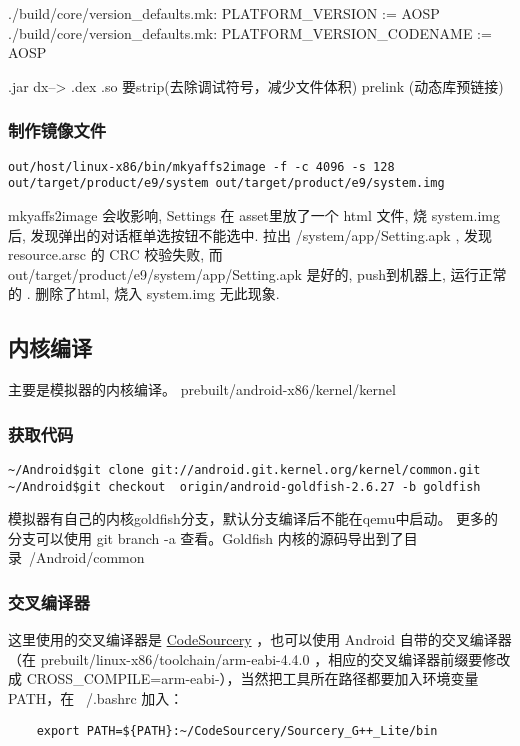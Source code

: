 \documentclass[a4paper,titlepage]{article}
\begin{document}
./build/core/version_defaults.mk:  PLATFORM_VERSION := AOSP 
./build/core/version_defaults.mk:  PLATFORM_VERSION_CODENAME := AOSP 



.jar   dx-->  .dex   
.so    要strip(去除调试符号，减少文件体积)  prelink (动态库预链接)
\subsubsection{制作镜像文件}
\begin{lstlisting}
out/host/linux-x86/bin/mkyaffs2image -f -c 4096 -s 128 out/target/product/e9/system out/target/product/e9/system.img
\end{lstlisting}
mkyaffs2image 会收影响,  Settings 在 asset里放了一个 html 文件, 烧 system.img
后, 发现弹出的对话框单选按钮不能选中. 拉出 /system/app/Setting.apk  , 发现 resource.arsc 的 CRC 校验失败, 而
out/target/product/e9/system/app/Setting.apk 是好的,  push到机器上, 运行正常的
.  删除了html,  烧入 system.img 无此现象.



\subsection{内核编译}

主要是模拟器的内核编译。
prebuilt/android-x86/kernel/kernel
\subsubsection{获取代码}
\begin{lstlisting}
~/Android$git clone git://android.git.kernel.org/kernel/common.git
~/Android$git checkout  origin/android-goldfish-2.6.27 -b goldfish
\end{lstlisting}
模拟器有自己的内核goldfish分支，默认分支编译后不能在qemu中启动。
更多的分支可以使用 git branch -a 查看。Goldfish 内核的源码导出到了目录~/Android/common

\subsubsection{交叉编译器}
这里使用的交叉编译器是 \href{
http://www.codesourcery.com/sgpp/lite/arm/portal/subscription?@template=lite}{CodeSourcery}
，也可以使用 Android 自带的交叉编译器 （在
prebuilt/linux-x86/toolchain/arm-eabi-4.4.0 ，相应的交叉编译器前缀要修改成
CROSS_COMPILE=arm-eabi-），当然把工具所在路径都要加入环境变量 PATH，在
~/.bashrc 加入：
\begin{lstlisting}
    export PATH=${PATH}:~/CodeSourcery/Sourcery_G++_Lite/bin
\end{lstlisting}
\end{document}
